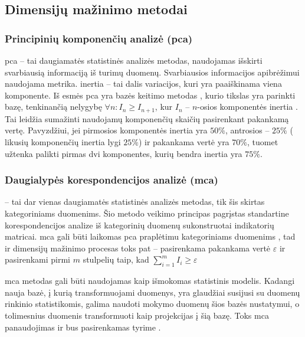 \subsection{Dimensijų mažinimo metodai}

\subsubsection{Principinių komponenčių analizė (\gls{pca})}

\gls{pca} -- tai daugiamatės statistinės analizės metodas, naudojamas išskirti svarbiausią informaciją iš turimų duomenų. Svarbiausios informacijos apibrėžimui naudojama  metrika. \Gls{inertia} -- tai dalis variacijos, kuri yra paaiškinama viena komponente. Iš esmės \gls{pca} yra bazės keitimo metodas , kurio tikslas yra parinkti bazę, tenkinančią nelygybę $\forall n: I_n \ge I_{n+1}$, kur $I_n$ -- $n$-osios komponentės \gls{inertia} \cite{abdiPrincipalComponentAnalysis2010}. Tai leidžia sumažinti naudojamų komponenčių skaičių pasirenkant pakankamą  vertę. Pavyzdžiui, jei pirmosios komponentės \gls{inertia} yra $50\%$, antrosios -- $25\%$ (\rightarrow \; likusių komponenčių \gls{inertia} lygi $25\%$) ir pakankama  vertė yra $70\%$, tuomet užtenka palikti pirmas dvi komponentes, kurių bendra \gls{inertia}  yra $75\%$.

\subsubsection{Daugialypės korespondencijos analizė (\gls{mca})}

 -- tai dar vienas daugiamatės statistinės analizės metodas, tik šis skirtas kategoriniams duomenims. Šio metodo veikimo principas pagrįstas standartine korespondencijos analize  iš kategorinių duomenų sukonstruotai indikatorių matricai. \gls{mca} gali būti laikomas \gls{pca} praplėtimu kategoriniams duomenims \cite{abdiMultipleCorrespondenceAnalysis2007}, tad ir dimensijų mažinimo procesas toks pat -- pasirenkama pakankama  vertė $\varepsilon$ ir pasirenkami pirmi $m$ stulpelių taip, kad $\sum_{i=1}^m{I_i} \ge \varepsilon$

\gls{mca} metodas gali būti naudojamas kaip išmokomas statistinis modelis. Kadangi nauja bazė, į kurią transformuojami duomenys, yra glaudžiai susijusi su duomenų rinkinio statistikomis, galima naudoti mokymo duomenų šios bazės nustatymui, o tolimesnius duomenis transformuoti kaip projekcijas į šią bazę. Toks \gls{mca} panaudojimas ir bus pasirenkamas tyrime .
% 
